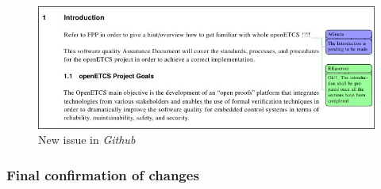 \documentclass{template/openetcs_article}
\begin{document}
\begin{figure}
\centering
\includegraphics [width=\textwidth]{./figures/CommentConfirmation.JPG}
\caption{New issue in {\it Github}}
\end{figure}

\subsubsection{Final confirmation of changes}
\end{document}
